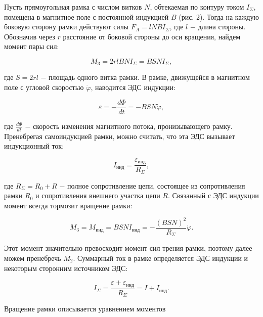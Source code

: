 \documentclass[a4paper,12pt]{article} %
\begin{document}
\hfill \break Пусть прямоугольная рамка с числом витков $N$, обтекаемая по контуру током $I_{\Sigma}$, помещена в магнитное поле с постоянной индукцией $B$ (рис. 2). Тогда на каждую боковую сторону рамки действуют силы $F_{A} = lNBI_{\Sigma}$, где $l$ $-$ длина стороны. Обозначив через $r$ расстояние от боковой стороны до оси вращения, найдем момент пары сил:

\begin{equation}\label{ linkname }
M_{3} = 2rlBNI_{\Sigma} = BSNI_{\Sigma},
\end{equation}

\hfill \break где $S = 2rl$ $-$ площадь одного витка рамки. В рамке, движущейся в магнитном поле с угловой скоростью $\dot\varphi$, наводится ЭДС индукции:

\begin{equation}\label{ linkname }
\varepsilon = -\frac{d\Phi}{dt} = -BSN\dot\varphi,
\end{equation}

\hfill \break где $\frac{d\Phi}{dt}$ $-$ скорость изменения магнитного потока, пронизывающего рамку. Пренебрегая самоиндукцией рамки, можно считать, что эта ЭДС вызывает индукционный ток:

\begin{equation}\label{ linkname }
I_\text{инд} = \frac{\varepsilon_\text{инд}}{R_{\Sigma}},
\end{equation}

\hfill \break где $R_{\Sigma} = R_{0} + R$ $-$ полное сопротивление цепи, состоящее из сопротивления рамки $R_{0}$ и сопротивления внешнего участка цепи $R$. Связанный с ЭДС индукции момент всегда тормозит вращение рамки:

\begin{equation}\label{ linkname }
M_{3} = M_\text{инд} = BSNI_\text{инд} = -\frac{(BSN)^2}{R_{\Sigma}}\dot\varphi.
\end{equation}

\hfill \break Этот момент значительно превосходит момент сил трения рамки, поэтому далее можем пренебречь $M_{2}$. Суммарный ток в рамке определяется ЭДС индукции и некоторым сторонним источником ЭДС:

\begin{equation}\label{ linkname }
I_{\Sigma} = \frac{\varepsilon + \varepsilon_\text{инд}}{R_{\Sigma}} = I + I_\text{инд}.
\end{equation}

\hfill \break Вращение рамки описывается уравнением моментов 
\end{document}
